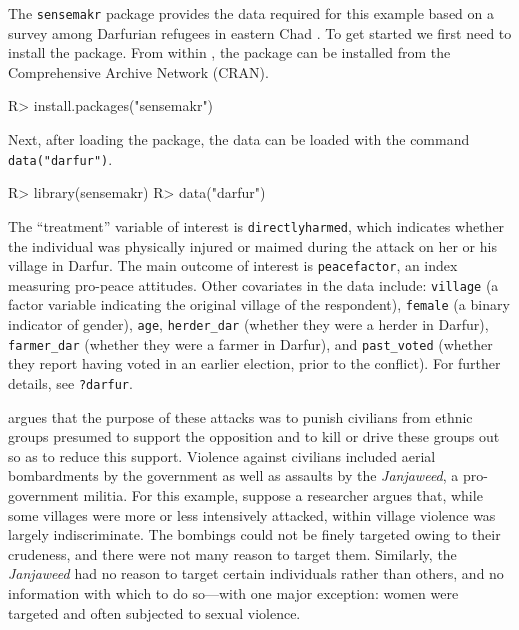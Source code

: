 \documentclass[
]{jss}
\begin{document}
The \texttt{sensemakr} package provides the data required for this
example based on a survey among Darfurian refugees in eastern Chad
\citep{hazlett:jcr2019}. To get started we first need to install the
package. From within , the  package can be
installed from the Comprehensive  Archive Network (CRAN).

\begin{CodeChunk}

\begin{CodeInput}
R> install.packages("sensemakr")
\end{CodeInput}
\end{CodeChunk}

Next, after loading the package, the data can be loaded with the command
\texttt{data("darfur")}.

\begin{CodeChunk}

\begin{CodeInput}
R> library(sensemakr)
R> data("darfur")
\end{CodeInput}
\end{CodeChunk}

The ``treatment'' variable of interest is \texttt{directlyharmed}, which
indicates whether the individual was physically injured or maimed during
the attack on her or his village in Darfur. The main outcome of interest
is \texttt{peacefactor}, an index measuring pro-peace attitudes. Other
covariates in the data include: \texttt{village} (a factor variable
indicating the original village of the respondent), \texttt{female} (a
binary indicator of gender), \texttt{age}, \texttt{herder\_dar} (whether
they were a herder in Darfur), \texttt{farmer\_dar} (whether they were a
farmer in Darfur), and \texttt{past\_voted} (whether they report having
voted in an earlier election, prior to the conflict). For further
details, see \texttt{?darfur}.

\citet{hazlett:jcr2019} argues that the purpose of these attacks was to
punish civilians from ethnic groups presumed to support the opposition
and to kill or drive these groups out so as to reduce this support.
Violence against civilians included aerial bombardments by the
government as well as assaults by the \emph{Janjaweed}, a pro-government
militia. For this example, suppose a researcher argues that, while some
villages were more or less intensively attacked, within village violence
was largely indiscriminate. The bombings could not be finely targeted
owing to their crudeness, and there were not many reason to target them.
Similarly, the \emph{Janjaweed} had no reason to target certain
individuals rather than others, and no information with which to do
so---with one major exception: women were targeted and often subjected
to sexual violence.
\end{document}
